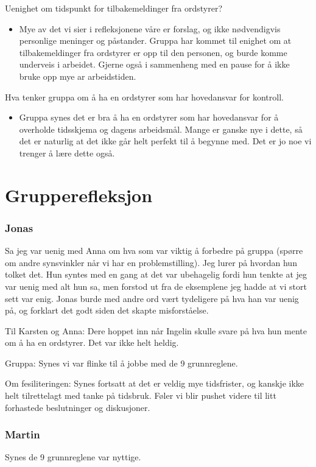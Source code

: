 \documentclass[5p]{elsarticle}
\begin{document}
Uenighet om tidspunkt for tilbakemeldinger fra ordstyrer?
\begin{itemize}
\item Mye av det vi sier i refleksjonene våre er forslag, og ikke nødvendigvis personlige meninger og påstander. Gruppa har kommet til enighet om at tilbakemeldinger fra ordstyrer er opp til den personen, og burde komme underveis i arbeidet. Gjerne også i sammenheng med en pause for å ikke bruke opp mye ar arbeidstiden.
\end{itemize}

Hva tenker gruppa om å ha en ordstyrer som har hovedansvar for kontroll.
\begin{itemize}
\item Gruppa synes det er bra å ha en ordstyrer som har hovedansvar for å overholde tidsskjema og dagens arbeidsmål. Mange er ganske nye i dette, så det er naturlig at det ikke går helt perfekt til å begynne med. Det er jo noe vi trenger å lære dette også.
\end{itemize}

\section*{Grupperefleksjon}
\subsubsection*{Jonas}
Sa jeg var uenig med Anna om hva som var viktig å forbedre på gruppa (spørre om andre synsvinkler når vi har en problemstilling). Jeg lurer på hvordan hun tolket det. Hun syntes med en gang at det var ubehagelig fordi hun tenkte at jeg var uenig med alt hun sa, men forstod ut fra de eksemplene jeg hadde at vi stort sett var enig. Jonas burde med andre ord vært tydeligere på hva han var uenig på, og forklart det godt siden det skapte misforståelse.

Til Karsten og Anna: Dere hoppet inn når Ingelin skulle svare på hva hun mente om å ha en ordstyrer. Det var ikke helt heldig.

Gruppa: Synes vi var flinke til å jobbe med de 9 grunnreglene.

Om fesiliteringen: Synes fortsatt at det er veldig mye tidsfrister, og kanskje ikke helt tilrettelagt med tanke på tidsbruk. Føler vi blir pushet videre til litt forhastede beslutninger og diskusjoner.

\subsubsection*{Martin}
Synes de 9 grunnreglene var nyttige.
\end{document}
